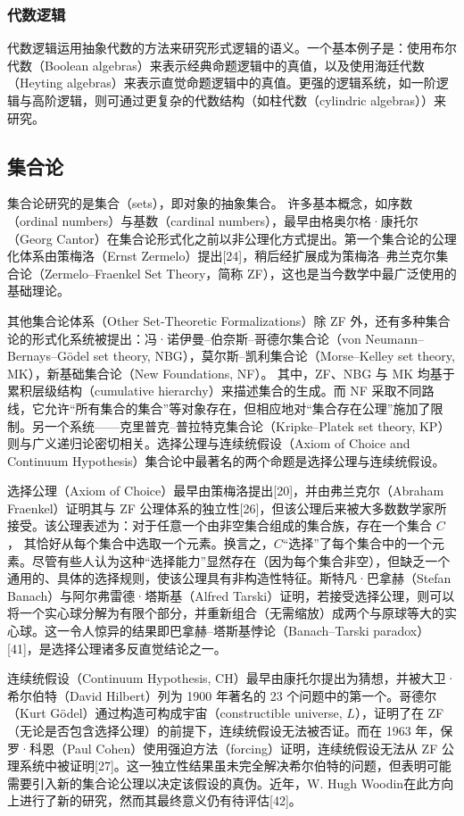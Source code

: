\subsubsection{代数逻辑}
代数逻辑运用抽象代数的方法来研究形式逻辑的语义。一个基本例子是：使用布尔代数（Boolean algebras）来表示经典命题逻辑中的真值，以及使用海廷代数（Heyting algebras）来表示直觉命题逻辑中的真值。更强的逻辑系统，如一阶逻辑与高阶逻辑，则可通过更复杂的代数结构（如柱代数（cylindric algebras））来研究。
\subsection{集合论}
集合论研究的是集合（sets），即对象的抽象集合。  许多基本概念，如序数（ordinal numbers）与基数（cardinal numbers），最早由格奥尔格·康托尔（Georg Cantor）在集合论形式化之前以非公理化方式提出。第一个集合论的公理化体系由策梅洛（Ernst Zermelo）提出[24]，稍后经扩展成为策梅洛–弗兰克尔集合论（Zermelo–Fraenkel Set Theory，简称 ZF），这也是当今数学中最广泛使用的基础理论。

其他集合论体系（Other Set-Theoretic Formalizations）除 ZF 外，还有多种集合论的形式化系统被提出：冯·诺伊曼–伯奈斯–哥德尔集合论（von Neumann–Bernays–Gödel set theory, NBG），莫尔斯–凯利集合论（Morse–Kelley set theory, MK），新基础集合论（New Foundations, NF）。
其中，ZF、NBG 与 MK 均基于累积层级结构（cumulative hierarchy）来描述集合的生成。而 NF 采取不同路线，它允许“所有集合的集合”等对象存在，但相应地对“集合存在公理”施加了限制。另一个系统——克里普克–普拉特克集合论（Kripke–Platek set theory, KP）则与广义递归论密切相关。选择公理与连续统假设（Axiom of Choice and Continuum Hypothesis）集合论中最著名的两个命题是选择公理与连续统假设。

选择公理（Axiom of Choice）最早由策梅洛提出[20]，并由弗兰克尔（Abraham Fraenkel）证明其与 ZF 公理体系的独立性[26]，但该公理后来被大多数数学家所接受。该公理表述为：对于任意一个由非空集合组成的集合族，存在一个集合 \( C \)，
其恰好从每个集合中选取一个元素。换言之，\( C \)“选择”了每个集合中的一个元素。尽管有些人认为这种“选择能力”显然存在（因为每个集合非空），但缺乏一个通用的、具体的选择规则，使该公理具有非构造性特征。斯特凡·巴拿赫（Stefan Banach）与阿尔弗雷德·塔斯基（Alfred Tarski）证明，若接受选择公理，则可以将一个实心球分解为有限个部分，并重新组合（无需缩放）成两个与原球等大的实心球。这一令人惊异的结果即巴拿赫–塔斯基悖论（Banach–Tarski paradox）[41]，是选择公理诸多反直觉结论之一。

连续统假设（Continuum Hypothesis, CH）最早由康托尔提出为猜想，并被大卫·希尔伯特（David Hilbert）列为 1900 年著名的 23 个问题中的第一个。哥德尔（Kurt Gödel）通过构造可构成宇宙（constructible universe, \(L\)），证明了在 ZF（无论是否包含选择公理）的前提下，连续统假设无法被否证。而在 1963 年，保罗·科恩（Paul Cohen）使用强迫方法（forcing）证明，连续统假设无法从 ZF 公理系统中被证明[27]。这一独立性结果虽未完全解决希尔伯特的问题，但表明可能需要引入新的集合论公理以决定该假设的真伪。近年，W. Hugh Woodin在此方向上进行了新的研究，然而其最终意义仍有待评估[42]。

